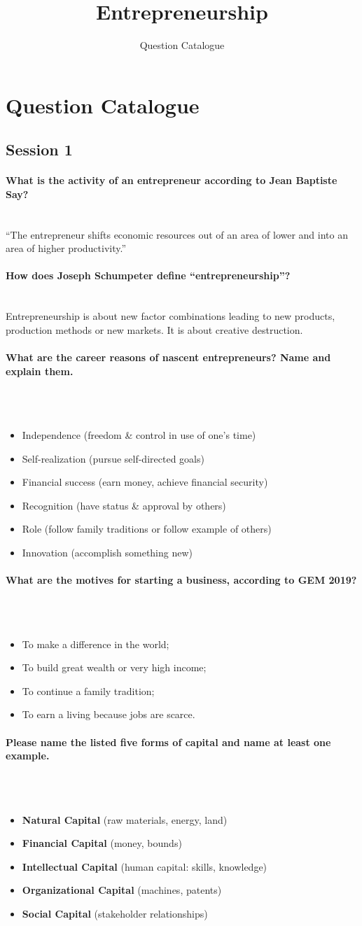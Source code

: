 \documentclass[10pt,a4paper,noendnumber=true]{scrartcl}
\title{Entrepreneurship}
\subtitle{Question Catalogue}
\author{}
\newcommand{\properparagraph}[1]{\paragraph{\textcolor{Emerald}{#1}}\mbox{}\\}
\begin{document}
\maketitle

\section{Question Catalogue}
\subsection{Session 1}
\properparagraph{What is the activity of an entrepreneur according to Jean Baptiste Say?}
"`The entrepreneur shifts economic resources out of an area of lower and into an area of higher productivity."'

\properparagraph{How does Joseph Schumpeter define “entrepreneurship”?}
Entrepreneurship is about new factor combinations
leading to new products, production methods or new
markets. It is about creative destruction.

\properparagraph{What are the career reasons of nascent entrepreneurs? Name and explain them.}
\\[-6ex]
\begin{itemize}
	\item Independence (freedom \& control in use of one’s time)
	\item Self-realization (pursue self-directed goals)
	\item Financial success (earn money, achieve financial security)
	\item Recognition (have status \& approval by others)
	\item Role (follow family traditions or follow example of others)
	\item Innovation (accomplish something new)
\end{itemize}

\properparagraph{What are the motives for starting a business, according to GEM 2019?}
\\[-6ex]
\begin{itemize}
	\item To make a difference in the world;
	\item To build great wealth or very high income;
	\item To continue a family tradition;
	\item To earn a living because jobs are scarce.
\end{itemize}

\properparagraph{Please name the listed five forms of capital and name at least one example.}
\\[-6ex]
\begin{itemize}
	\item \textbf{Natural Capital} (raw materials, energy, land)
	\item \textbf{Financial Capital} (money, bounds)
	\item \textbf{Intellectual Capital} (human capital: skills, knowledge)
	\item \textbf{Organizational Capital} (machines, patents)
	\item \textbf{Social Capital} (stakeholder relationships)
\end{itemize}
\end{document}
